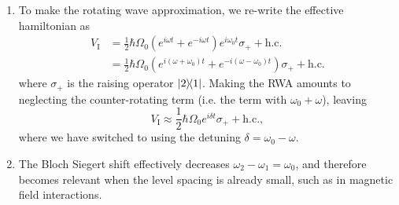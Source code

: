 \documentclass[12pt]{article}
\begin{document}
\begin{enumerate}[label=(\alph*)]
    \item To make the rotating wave approximation, we re-write the effective hamiltonian as
    \begin{align*}
        V_\text{I} &= \frac{1}{2}\hbar\Omega_0\left(e^{i\omega t} + e^{-i\omega t}\right)e^{i\omega_0 t}\sigma_+ + \text{h.c.} \\
        &= \frac{1}{2}\hbar\Omega_0\left(e^{i(\omega + \omega_0)t} + e^{-i(\omega - \omega_0)t}\right)\sigma_+ + \text{h.c.}
    \end{align*}
    where $\sigma_+$ is the raising operator $\dyad{2}{1}$. Making the RWA amounts to neglecting the counter-rotating term (i.e. the term with $\omega_0 + \omega$), leaving
    \[ V_\text{I} \approx \frac{1}{2}\hbar\Omega_0e^{i\delta t}\sigma_+ + \text{h.c.}, \]
    where we have switched to using the detuning $\delta = \omega_0 - \omega$.

    \item The Bloch Siegert shift effectively decreases $\omega_2 - \omega_1 = \omega_0$, and therefore becomes relevant when the level spacing is already small, such as in magnetic field interactions.
\end{enumerate}
\end{document}

